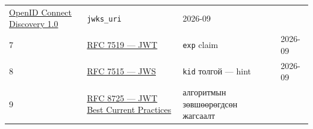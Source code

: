 \begin{longtable}[]{@{}llll@{}}
\begin{minipage}[t]{0.22\columnwidth}
\href{https://openid.net/specs/openid-connect-discovery-1_0.html}{OpenID Connect Discovery 1.\allowbreak{}0}\strut
\end{minipage} & \begin{minipage}[t]{0.22\columnwidth}\raggedright
\texttt{jwks\_uri}\strut
\end{minipage} & \begin{minipage}[t]{0.22\columnwidth}\raggedright
2026-09\strut
\end{minipage}\tabularnewline
\begin{minipage}[t]{0.22\columnwidth}\raggedright
7\strut
\end{minipage} & \begin{minipage}[t]{0.22\columnwidth}\raggedright
\href{https://www.rfc-editor.org/rfc/rfc7519}{RFC 7519 --- JWT}\strut
\end{minipage} & \begin{minipage}[t]{0.22\columnwidth}\raggedright
\texttt{exp} claim\strut
\end{minipage} & \begin{minipage}[t]{0.22\columnwidth}\raggedright
2026-09\strut
\end{minipage}\tabularnewline
\begin{minipage}[t]{0.22\columnwidth}\raggedright
8\strut
\end{minipage} & \begin{minipage}[t]{0.22\columnwidth}\raggedright
\href{https://www.rfc-editor.org/rfc/rfc7515}{RFC 7515 --- JWS}\strut
\end{minipage} & \begin{minipage}[t]{0.22\columnwidth}\raggedright
\texttt{kid} толгой --- hint\strut
\end{minipage} & \begin{minipage}[t]{0.22\columnwidth}\raggedright
2026-09\strut
\end{minipage}\tabularnewline
\begin{minipage}[t]{0.22\columnwidth}\raggedright
9\strut
\end{minipage} & \begin{minipage}[t]{0.22\columnwidth}\raggedright
\href{https://www.rfc-editor.org/rfc/rfc8725}{RFC 8725 --- JWT Best Current Practices}\strut
\end{minipage} & \begin{minipage}[t]{0.22\columnwidth}\raggedright
алгоритмын зөвшөөрөгдсөн жагсаалт\strut
\end{minipage} & \begin{minipage}[t]{0.22\columnwidth}\raggedright

\end{minipage}
\end{longtable}
